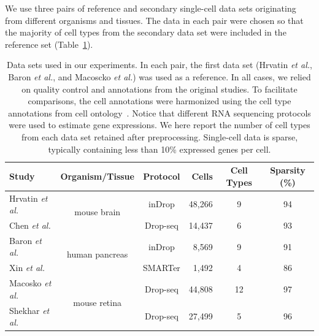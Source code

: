 \documentclass[runningheads]{llncs}
\newcommand{\etal}{\textit{et al.}}
\begin{document}
We use three pairs of reference and secondary single-cell data sets originating
from different organisms and tissues. The data in each pair were chosen so that
the majority of cell types from the secondary data set were included in the
reference set (Table~\ref{tab:datasets}).

\begin{table}[ht]
\begin{center}
\setlength\tabcolsep{4pt}
\begin{tabular}{l c c r c c}
\toprule
Study & Organism/Tissue & Protocol & Cells & Cell Types & Sparsity (\%) \\
\midrule
Hrvatin \etal & \multirow{2}{*}{mouse brain} & inDrop & 48,266 & 9 & 94 \\
Chen \etal & & Drop-seq & 14,437 & 6 & 93 \\[5pt]
Baron \etal & \multirow{2}{*}{human pancreas} & inDrop & 8,569 & 9 & 91 \\
Xin \etal & & SMARTer & 1,492 & 4 & 86 \\[5pt]
Macosko \etal & \multirow{2}{*}{mouse retina} & Drop-seq & 44,808 & 12 & 97 \\
Shekhar \etal & & Drop-seq & 27,499 & 5 & 96 \\
\bottomrule
\end{tabular}
\end{center}
\caption{Data sets used in our experiments. In each pair, the first data set
(Hrvatin \etal, Baron \etal, and Macoscko \etal) was used as a reference. In
all cases, we relied on quality control and annotations from the original
studies. To facilitate comparisons, the cell annotations were harmonized using
the cell type annotations from cell ontology~\cite{cell_ontology}. Notice that
different RNA sequencing protocols were used to estimate gene expressions. We
here report the number of cell types from each data set retained after
preprocessing. Single-cell data is sparse, typically containing less than 10\%
expressed genes per cell.}
\label{tab:datasets}
\end{table}
\end{document}
